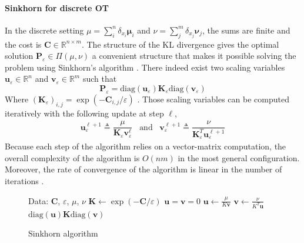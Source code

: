 \paragraph{Sinkhorn for discrete OT}
In the discrete setting $\mu = \sum_i^n\delta_{x_i}\bm{\mu}_i$ and $\nu = \sum_j^m\delta_{x_j}\bm{\nu}_j$, the sums are finite and the cost is $\mathbf{C} \in \mathbb{R}^{n\times m}$. The structure of the KL divergence gives the optimal solution $\mathbf{P}_\varepsilon \in \Pi(\mu, \nu)$ a convenient structure that makes it possible solving the problem using Sinkhorn's algorithm \cite{cuturi_sinkhorn_2013}. There indeed exist two scaling variables $\mathbf{u}_\varepsilon \in \mathbb{R}^n$ and $\mathbf{v}_\varepsilon \in \mathbb{R}^m$ such that
\[
\mathbf{P}_\varepsilon = \text{diag}(\mathbf{u}_\varepsilon)\mathbf{K}_\varepsilon\text{diag}(\mathbf{v}_\varepsilon)
\]
Where $(\mathbf{K}_\varepsilon)_{i,j} = \exp(-\mathbf{C}_{i,j}/\varepsilon)$ \cite{peyre_computational_2018}. Those scaling variables can be computed iteratively with the following update at step $\ell$,
\begin{gather}
\mathbf{u}^{\ell+1}_\varepsilon \triangleq \dfrac{\mu}{\mathbf{K}_\varepsilon\mathbf{v}^\ell_\varepsilon} \hspace{10pt}  \text{and} \hspace{10pt}\mathbf{v}^{\ell+1}_\varepsilon \triangleq \dfrac{\nu}{\mathbf{K}^T_\varepsilon\mathbf{u}^{\ell+1}_\varepsilon}
\end{gather}
Because each step of the algorithm relies on a vector-matrix computation, the overall complexity of the algorithm is $O(nm)$ in the most general configuration. Moreover, the rate of convergence of the algorithm is linear in the number of iterations \cite{franklin_scaling_1989}.

\begin{figure}[htb]
    \centering
    \begin{minipage}{.8\linewidth}
\begin{algorithm}[H]
    \caption{Sinkhorn algorithm}\label{alg:sinkhorn}
    \begin{algorithmic}[1]
        \State Data: $\mathbf{C}$, $\varepsilon$, $\mu$, $\nu$
        \State $\mathbf{K} \gets \exp(-\mathbf{C}/\varepsilon)$
        \State $\mathbf{u} = \mathbf{v} = 0$
            \State $\mathbf{u} \gets \frac{\mu}{K\mathbf{v}}$
            \State $\mathbf{v} \gets \frac{\nu}{K^T\mathbf{u}}$
        \EndWhile
        \State \Return $\text{diag}(\mathbf{u})\mathbf{K}\text{diag}(\mathbf{v})$
    \end{algorithmic}
\end{algorithm}
\end{minipage}
\end{figure}


